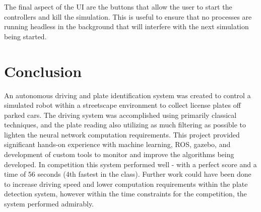\documentclass[titlepage, twocolumn]{article}
\begin{document}
The final aspect of the UI are the buttons that allow the user to start the controllers and kill the simulation. This is useful to ensure that no processes are running headless in the background that will interfere with the next simulation being started. 

\section{Conclusion}

An autonomous driving and plate identification system was created to control a simulated robot within a streetscape environment to collect license plates off parked cars. The driving system was accomplished using primarily classical techniques, and the plate reading also utilizing as much filtering as possible to lighten the neural network computation requirements. This project provided significant hands-on experience with machine learning, ROS, gazebo, and development of custom tools to monitor and improve the algorithms being developed. In competition this system performed well - with a perfect score and a time of 56 seconds (4th fastest in the class). Further work could have been done to increase driving speed and lower computation requirements within the plate detection system, however within the time constraints for the competition, the system performed admirably. 
\end{document}
